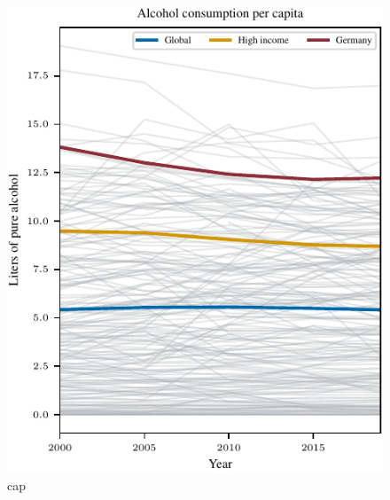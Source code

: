 \begin{figure}[ht]
\vskip 0.2in
\begin{center}
\centerline{\includegraphics[width=\columnwidth]{fig/fig_AlcoholConsumptionPerCapita.pdf}}
\caption{cap}
\label{AlcoholConsumptionPerCapita}
\end{center}
\vskip -0.2in
\end{figure}

